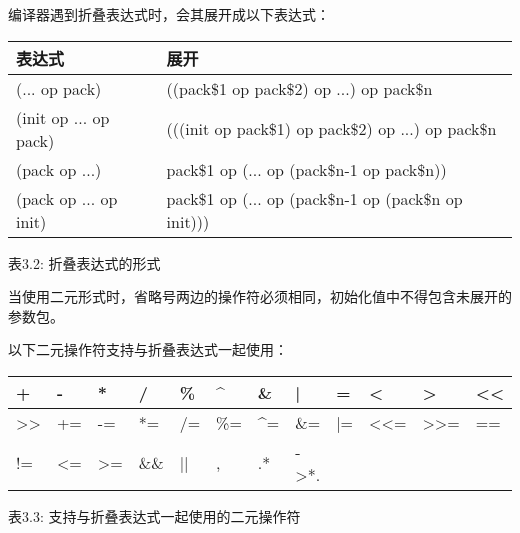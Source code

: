 
编译器遇到折叠表达式时，会其展开成以下表达式：

\begin{longtable}{|l|l|}
\hline
\textbf{表达式}   & \textbf{展开}                                 \\ \hline
\endfirsthead
%
\endhead
%
(... op pack)         & ((pack\$1 op pack\$2) op ...) op pack\$n             \\ \hline
(init op ... op pack) & (((init op pack\$1) op pack\$2) op ...) op pack\$n   \\ \hline
(pack op ...)         & pack\$1 op (... op (pack\$n-1 op pack\$n))           \\ \hline
(pack op ... op init) & pack\$1 op (... op (pack\$n-1 op (pack\$n op init))) \\ \hline
\end{longtable}

\begin{center}
表3.2: 折叠表达式的形式
\end{center}

当使用二元形式时，省略号两边的操作符必须相同，初始化值中不得包含未展开的参数包。

以下二元操作符支持与折叠表达式一起使用：

\begin{longtable}{|l|l|l|l|l|l|l|l|l|l|l|l|}
\hline
+ &
- &
* &
/ &
\% &
\textasciicircum{} &
\& &
| &
= &
\textless{} &
\textgreater{} &
\textless{}\textless{} \\ \hline
\endfirsthead
%
\endhead
%
\textgreater{}\textgreater{} &
+= &
-= &
*= &
/= &
\%= &
\textasciicircum{}= &
\&= &
|= &
\textless{}\textless{}= &
\textgreater{}\textgreater{}= &
== \\ \hline
!= &
\textless{}= &
\textgreater{}= &
\&\& &
|| &
, &
.* &
-\textgreater{}*. &
&
&
&
\\ \hline
\end{longtable}

\begin{center}
表3.3: 支持与折叠表达式一起使用的二元操作符
\end{center}

